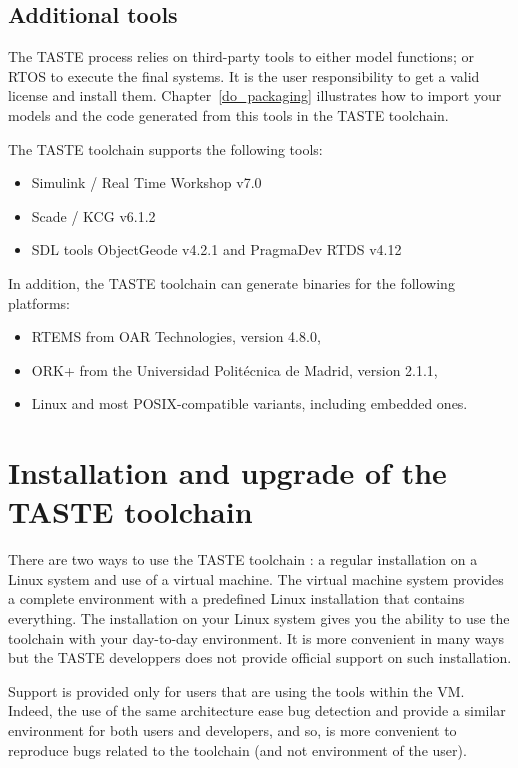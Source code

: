 \documentclass[11pt]{book}
\newcommand{\Concept}[1]{#1\xspace}
\newcommand{\taste}{\Concept{TASTE}}
\begin{document}
   \section{Additional tools}

   The \taste process relies on third-party tools to either model
 functions; or RTOS to execute the final systems. It is the user
 responsibility to get a valid license and install
 them. Chapter~\ref{do_packaging} illustrates how to import your
 models and the code generated from this tools in the \taste
 toolchain.

The \taste toolchain supports the following tools:

\begin{itemize}
\item Simulink / Real Time Workshop v7.0
\item Scade / KCG v6.1.2
\item SDL tools ObjectGeode v4.2.1 and PragmaDev RTDS v4.12
\end{itemize}

In addition, the \taste toolchain can generate binaries for the
 following platforms:

\begin{itemize}
\item RTEMS from OAR Technologies, version 4.8.0,
\item ORK+ from the Universidad Polit\'ecnica de Madrid, version 2.1.1,
\item Linux and most POSIX-compatible variants, including embedded ones.
\end{itemize}

\chapter{Installation and upgrade of the TASTE toolchain}
There are two ways to use the TASTE toolchain : a regular installation on a
Linux system and use of a virtual machine. The virtual machine system provides a
complete environment with a predefined Linux installation that contains
everything. The installation on your Linux system gives you the ability to use
the toolchain with your day-to-day environment. It is more convenient in many
ways but the TASTE developpers does not provide official support on such
installation.

Support is provided only for users that are using the tools within the VM.
Indeed, the use of the same architecture ease bug detection and provide a
similar environment for both users and developers, and so, is more convenient to
reproduce bugs related to the toolchain (and not environment of the user).
\end{document}
